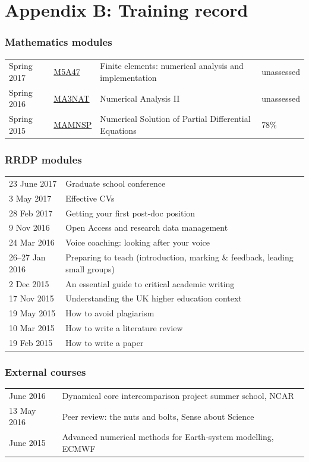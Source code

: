 \documentclass[a4paper,11pt]{article}
\begin{document}
\newpage

\section*{Appendix B: Training record}

\subsubsection*{Mathematics modules}
\footnotesize
\begin{tabular}{l l l l}
Spring 2017	& \href{https://finite-element.github.io}{M5A47}  & Finite elements: numerical analysis and implementation & unassessed \\
Spring 2016	& \href{www.reading.ac.uk/module/document.aspx?modP=MA3NAT&modYR=1516}{MA3NAT} & Numerical Analysis II & unassessed \\
Spring 2015	& \href{www.reading.ac.uk/modules/document.aspx?modP=MAMNSP&modYR=1415}{MAMNSP} & Numerical Solution of Partial Differential Equations  & 78\% \\
\end{tabular}

\subsubsection*{RRDP modules}
\begin{tabular}{l l}
23 June 2017    & Graduate school conference \\
3 May 2017	& Effective CVs \\
28 Feb 2017	& Getting your first post-doc position \\
9 Nov 2016      & Open Access and research data management \\
24 Mar 2016	& Voice coaching: looking after your voice \\
26--27 Jan 2016 & Preparing to teach (introduction, marking \& feedback, leading small groups) \\
2 Dec 2015	& An essential guide to critical academic writing \\
17 Nov 2015	& Understanding the UK higher education context \\
19 May 2015	& How to avoid plagiarism \\
10 Mar 2015	& How to write a literature review \\
19 Feb 2015	& How to write a paper \\
\end{tabular}

\subsubsection*{External courses}
\begin{tabular}{l l}
June 2016 & Dynamical core intercomparison project summer school, NCAR \\
13 May 2016 & Peer review: the nuts and bolts, Sense about Science \\
June 2015 & Advanced numerical methods for Earth-system modelling, ECMWF \\
\end{tabular}
\end{document}
